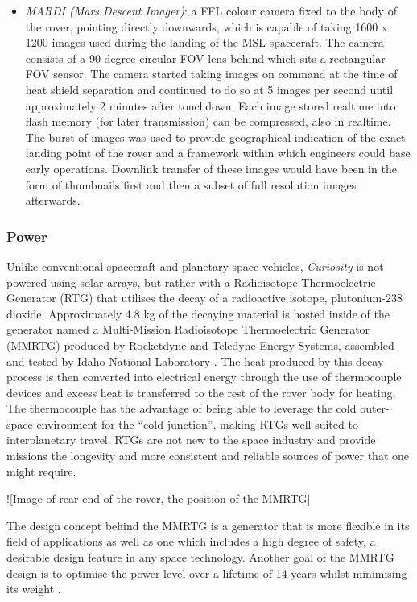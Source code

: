 \begin{itemize}
\begin{itemize}
            \item \textit{MARDI (Mars Descent Imager)}: a FFL colour camera fixed to the body of the rover, pointing directly downwards, which is capable of taking 1600 x 1200 images used during the landing of the MSL spacecraft. The camera consists of a 90 degree circular FOV lens behind which sits a rectangular FOV sensor. The camera started taking images on command at the time of heat shield separation and continued to do so at 5 images per second until approximately 2 minutes after touchdown. Each image stored realtime into flash memory (for later transmission) can be compressed, also in realtime. The burst of images was used to provide geographical indication of the exact landing point of the rover and a framework within which engineers could base early operations. Downlink transfer of these images would have been in the form of thumbnails first and then a subset of full resolution images afterwards.
          \end{itemize}
        \end{itemize}
      
      \subsubsection{Power}
        Unlike conventional spacecraft and planetary space vehicles, \textit{Curiosity} is not powered using solar arrays, but rather with a Radioisotope Thermoelectric Generator (RTG) that utilises the decay of a radioactive isotope, plutonium-238 dioxide. Approximately 4.8 kg of the decaying material is hosted inside of the generator named a Multi-Mission Radioisotope Thermoelectric Generator (MMRTG) produced by Rocketdyne and Teledyne Energy Systems, assembled and tested by Idaho National Laboratory \cite{inlgovfuelingcuriosity}. The heat produced by this decay process is then converted into electrical energy through the use of thermocouple devices and excess heat is transferred to the rest of the rover body for heating. The thermocouple has the advantage of being able to leverage the cold outer-space environment for the ``cold junction'', making RTGs well suited to interplanetary travel. RTGs are not new to the space industry and provide missions the longevity and more consistent and reliable sources of power that one might require.
        
        ![Image of rear end of the rover, the position of the MMRTG]
        
        The design concept behind the MMRTG is a generator that is more flexible in its field of applications as well as one which includes a high degree of safety, a desirable design feature in any space technology. Another goal of the MMRTG design is to optimise the power level over a lifetime of 14 years whilst minimising its weight \cite{srpsmmrtg}.
      
